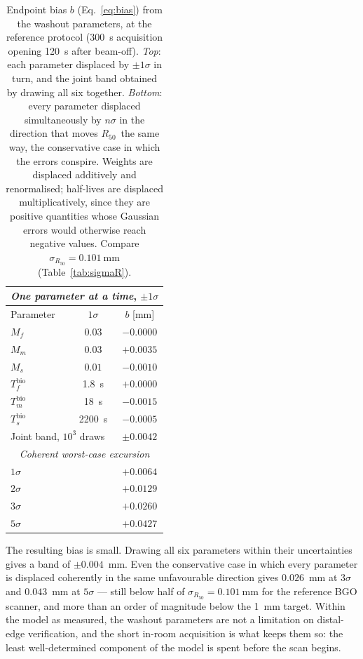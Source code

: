 \documentclass[11pt]{article}
\newcommand{\Rc}{\ensuremath{R_{50}}}
\begin{document}
\begin{table}[htbp!]
  \centering
  \begin{tabular}{lcc}
    \toprule
    \multicolumn{3}{c}{\emph{One parameter at a time}, $\pm1\sigma$} \\
    \midrule
    Parameter & $1\sigma$ & $b$ [mm] \\
    \midrule
    $M_f$              & $0.03$   & $-0.0000$ \\
    $M_m$              & $0.03$   & $+0.0035$ \\
    $M_s$              & $0.01$   & $-0.0010$ \\
    $T_f^{\mathrm{bio}}$ & \SI{1.8}{s}    & $+0.0000$ \\
    $T_m^{\mathrm{bio}}$ & \SI{18}{s}     & $-0.0015$ \\
    $T_s^{\mathrm{bio}}$ & \SI{2200}{s}   & $-0.0005$ \\
    \midrule
    \multicolumn{2}{l}{Joint band, $10^3$ draws}        & $\pm0.0042$ \\
    \midrule
    \multicolumn{3}{c}{\emph{Coherent worst-case excursion}} \\
    \midrule
    \multicolumn{2}{l}{$1\sigma$} & $+0.0064$ \\
    \multicolumn{2}{l}{$2\sigma$} & $+0.0129$ \\
    \multicolumn{2}{l}{$3\sigma$} & $+0.0260$ \\
    \multicolumn{2}{l}{$5\sigma$} & $+0.0427$ \\
    \bottomrule
  \end{tabular}
  \caption{Endpoint bias $b$ (Eq.~\ref{eq:bias}) from the washout parameters, at
    the reference protocol (\SI{300}{s} acquisition opening \SI{120}{s} after
    beam-off). \emph{Top}: each parameter displaced by $\pm1\sigma$ in turn, and
    the joint band obtained by drawing all six together. \emph{Bottom}: every
    parameter displaced simultaneously by $n\sigma$ in the direction that moves
    \Rc\ the same way, the conservative case in which the errors conspire.
    Weights are displaced additively and renormalised; half-lives are displaced
    multiplicatively, since they are positive quantities whose Gaussian errors
    would otherwise reach negative values. Compare
    $\sigma_{\Rc} = \SI{0.101}{\milli\metre}$ (Table~\ref{tab:sigmaR}).}
  \label{tab:sys_washout}
\end{table}

The resulting bias is small. Drawing all six parameters within their
uncertainties gives a band of $\pm0.004$~mm. Even the conservative case in which
every parameter is displaced coherently in the same unfavourable direction gives
$0.026$~mm at $3\sigma$ and $0.043$~mm at $5\sigma$ --- still below half of
$\sigma_{\Rc} = \SI{0.101}{\milli\metre}$ for the reference BGO scanner, and more
than an order of magnitude below the \SI{1}{mm} target. Within the model as
measured, the washout parameters are not a limitation on distal-edge
verification, and the short in-room acquisition is what keeps them so: the least
well-determined component of the model is spent before the scan begins.
\end{document}
